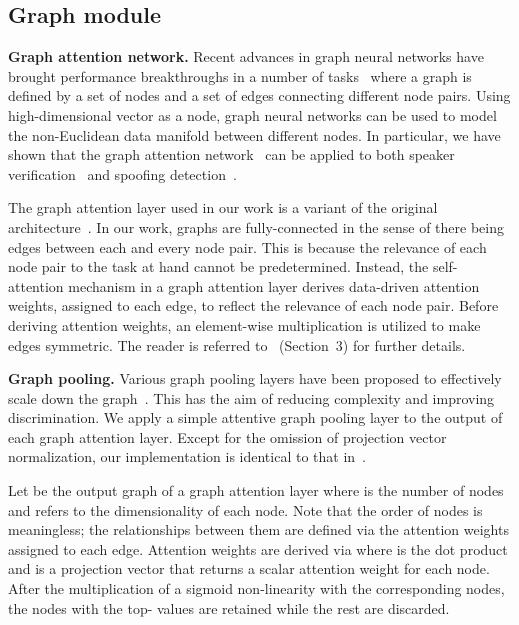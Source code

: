 \documentclass{article}
\newcommand{\newpara}[1]{\vspace{8pt}\noindent\textbf{#1}}
\begin{document}
\subsection{Graph module}
\label{sec:GATandGPool}

\newpara{Graph attention network.}
Recent advances in graph neural networks have brought performance breakthroughs in a number of tasks~\cite{velickovic2018graph,jung2021graph,tak2021graph} where a graph is defined by a set of nodes and a set of edges connecting different node pairs. 
Using high-dimensional vector as a node, graph neural networks can be used to model the non-Euclidean data manifold between different nodes.
In particular, we have shown that the graph attention network~\cite{velickovic2018graph} can be applied to both speaker verification~\cite{jung2021graph} and spoofing detection~\cite{tak2021graph, tak2021end}.

The graph attention layer used in our work is a variant of the original architecture~\cite{velickovic2018graph}.
In our work, graphs are fully-connected in the sense of there being edges between each and every node pair. 
This is because the relevance of each node pair to the task at hand cannot be predetermined. 
Instead, the self-attention mechanism in a graph attention layer derives data-driven attention weights, assigned to each edge, to reflect the relevance of each node pair. 
Before deriving attention weights, an element-wise multiplication is utilized to make edges symmetric.
The reader is referred to~\cite{tak2021end} (Section~3) for further details. 

\newpara{Graph pooling.}
Various graph pooling layers have been proposed to effectively scale down the graph~\cite{lee2019self,gao2019graph}.
This has the aim of reducing complexity and improving discrimination.
We apply a simple attentive graph pooling layer to the output of each graph attention layer. 
Except for the omission of projection vector normalization, our implementation is identical to that in~\cite{gao2019graph}.

Let  be the output graph of a graph attention layer where  is the number of nodes and  refers to the dimensionality of each node. 
Note that the order of nodes is meaningless; the relationships between them are defined via the attention weights assigned to each edge. 
Attention weights are derived via  where  is the dot product and  is a projection vector that returns a scalar attention weight for each node. 
After the multiplication of a sigmoid non-linearity with the corresponding  nodes, the nodes with the top- values are retained while the rest are discarded. 
\end{document}
